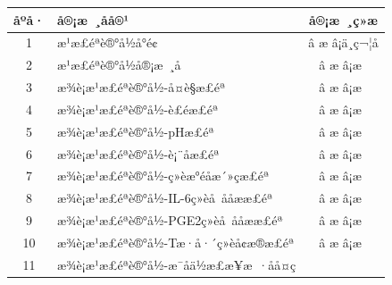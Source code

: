 \documentclass[UTF8,10pt,a4paper,fontset=fandol]{ctexart}
\newcommand{\fieldvalue}[1]{#1}
\newcommand{\handwritten}[1]{#1}
\begin{document}
\begin{center}
\small
\begin{tabularx}{\textwidth}{|c|X|c|}
\hline
åºå· & å®¡æ ¸åå®¹ & å®¡æ ¸ç»æ \\
\hline
1 & æ¹æ£éªè®°å½å°é¢ &
\fieldvalue{\handwritten{â æ}} \quad â¡ä¸ç¬¦å \\
\hline
2 & æ¹æ£éªè®°å½å®¡æ ¸å &
\fieldvalue{\handwritten{â æ}} \quad â¡æ  \\
\hline
3 & æ¾è¡æ¹æ£éªè®°å½-å¤è§æ£éª &
\fieldvalue{\handwritten{â æ}} \quad â¡æ  \\
\hline
4 & æ¾è¡æ¹æ£éªè®°å½-è£éæ£éª &
\fieldvalue{\handwritten{â æ}} \quad â¡æ  \\
\hline
5 & æ¾è¡æ¹æ£éªè®°å½-pHæ£éª &
\fieldvalue{\handwritten{â æ}} \quad â¡æ  \\
\hline
6 & æ¾è¡æ¹æ£éªè®°å½-è¡¨åæ£éª &
\fieldvalue{\handwritten{â æ}} \quad â¡æ  \\
\hline
7 & æ¾è¡æ¹æ£éªè®°å½-ç»èæ°éåæ´»çæ£éª &
\fieldvalue{\handwritten{â æ}} \quad â¡æ  \\
\hline
8 & æ¾è¡æ¹æ£éªè®°å½-IL-6ç»èå å­åææ£éª &
\fieldvalue{\handwritten{â æ}} \quad â¡æ  \\
\hline
9 & æ¾è¡æ¹æ£éªè®°å½-PGE2ç»èå å­åææ£éª &
\fieldvalue{\handwritten{â æ}} \quad â¡æ  \\
\hline
10 & æ¾è¡æ¹æ£éªè®°å½-Tæ·å·´ç»èå¢æ®æ£éª &
\fieldvalue{\handwritten{â æ}} \quad â¡æ  \\
\hline
11 & æ¾è¡æ¹æ£éªè®°å½-æ¯åä½æ£æ¥æ ·åå¤ç &

\end{tabularx}
\end{center}
\end{document}
